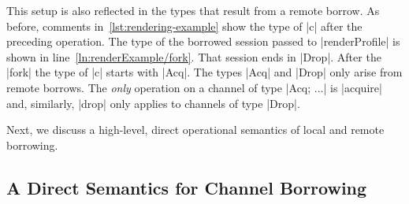 This setup is also reflected in the types that result from a remote borrow. As
before, comments in~\cref{lst:rendering-example} show the type of |c| after the
preceding operation. The type of
the borrowed session passed to |renderProfile| is shown in
line~\ref*{ln:renderExample/fork}. That session ends in |Drop|. After the |fork|
the type of |c| starts with |Acq|. The types |Acq| and |Drop| only arise from
remote borrows. The \emph{only} operation on a channel of type |Acq; ...| is
|acquire| and, similarly, |drop| only applies to channels of type |Drop|.

Next, we discuss a high-level, direct operational semantics of local and remote borrowing.


\subsection{A Direct Semantics for Channel Borrowing}
\label{sec:direct-semant-chann}

\begin{Listing}
  \TightCode
  \linenoon
  \setlength\linenowidth{1em}
  \setlength\commentindent{.75em}
  \setlength\blanklineskip{\medskipamount}
  \begin{minipage}[t]{.48\linewidth}
    \linenoreset
    \CodeRenderRestElab
  \end{minipage}\hfill
  \begin{minipage}[t]{.48\linewidth}
    \linenoreset
    \CodeRenderUserElab
  \end{minipage}\\
  \begin{subcaptiongroup}
    \parbox{.48\linewidth}{%
      \caption{The translation of |renderRest| uses |lsplit|. The concatenated
        type of |c1| and |c2| is equal to the original type of |c|.}
      \label{fig:rendering-example-elab/local}}\hfill
    \parbox{.48\linewidth}{%
      \caption{The translation of |renderUser| uses |rsplit|. Proper synchronization
        between |c1| and |c2| is ensured by the additional |Drop| and |Acq|
        session types.}
      \label{fig:rendering-example-elab/remote}}%
  \end{subcaptiongroup}
  \caption{Snippets of the rendering example elaborated to explicit split operations}
  \label{fig:rendering-example-elab}
\end{Listing}

